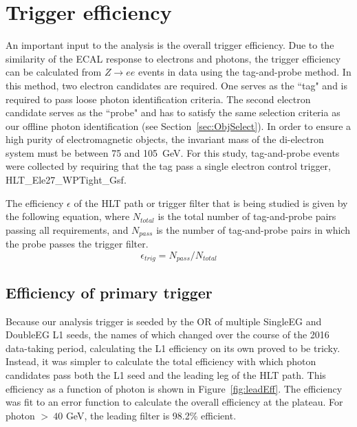 
\section{Trigger efficiency}
\label{sec:trigEff}
An important input to the analysis is the overall trigger efficiency. Due to the similarity of the ECAL response 
to electrons and photons, the trigger efficiency can be calculated from 
$Z\rightarrow ee$ events in data using the tag-and-probe method. In this method, two electron candidates
are required. One serves as the ``tag" and is required to pass loose photon identification criteria. 
The second electron candidate serves
as the ``probe" and has to satisfy the same selection criteria as our offline photon identification (see Section~\ref{sec:ObjSelect}). 
In order to ensure a high purity of electromagnetic objects, the invariant mass of the di-electron system must be between 75 and 105~GeV. 
For this study, tag-and-probe events were collected by requiring that the tag pass
a single electron control trigger, HLT\_Ele27\_WPTight\_Gsf.


The efficiency $\epsilon$ of the HLT path or trigger filter that is being studied is given by the following equation, where $N_{total}$ is the total number of tag-and-probe pairs 
passing all requirements, and $N_{pass}$ is the number of tag-and-probe pairs in which  the probe passes the trigger filter.
\begin{equation}
 \epsilon_{trig} = N_{pass} / N_{total}
\end{equation}

\subsection{Efficiency of primary trigger}
\label{sec:TnP_Eff}

Because our analysis trigger is seeded by the OR of multiple SingleEG and DoubleEG L1 seeds, the names of which changed over the course of the 2016 data-taking period, calculating the L1 efficiency on its own proved to be tricky. Instead, it was simpler to calculate the total efficiency with which photon candidates pass both the L1 seed and the leading leg of the HLT path. This efficiency as a function of photon \pt is shown in Figure~\ref{fig:leadEff}. The efficiency was fit to an error function to calculate the overall efficiency at the plateau. For photon \pt $>~40$ GeV, the leading filter is 98.2\% efficient.

